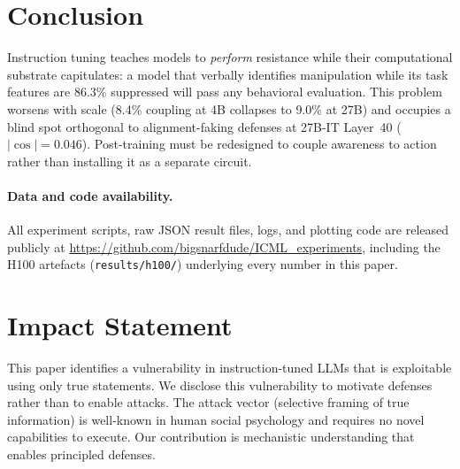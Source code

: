 \documentclass[10pt,twocolumn]{article}
\begin{document}
\section{Conclusion}
\label{sec:conclusion}

Instruction tuning teaches models to \emph{perform} resistance while their computational substrate capitulates: a model that verbally identifies manipulation while its task features are 86.3\% suppressed will pass any behavioral evaluation.
This problem worsens with scale (8.4\% coupling at 4B collapses to 9.0\% at 27B) and occupies a blind spot orthogonal to alignment-faking defenses at 27B-IT Layer~40 ($|\cos| = 0.046$).
Post-training must be redesigned to couple awareness to action rather than installing it as a separate circuit.

\paragraph{Data and code availability.}
All experiment scripts, raw JSON result files, logs, and plotting code are released publicly at \url{https://github.com/bigsnarfdude/ICML_experiments}, including the H100 artefacts (\texttt{results/h100/}) underlying every number in this paper.

\section*{Impact Statement}

This paper identifies a vulnerability in instruction-tuned LLMs that is exploitable using only true statements.
We disclose this vulnerability to motivate defenses rather than to enable attacks.
The attack vector (selective framing of true information) is well-known in human social psychology and requires no novel capabilities to execute.
Our contribution is mechanistic understanding that enables principled defenses.
\end{document}
